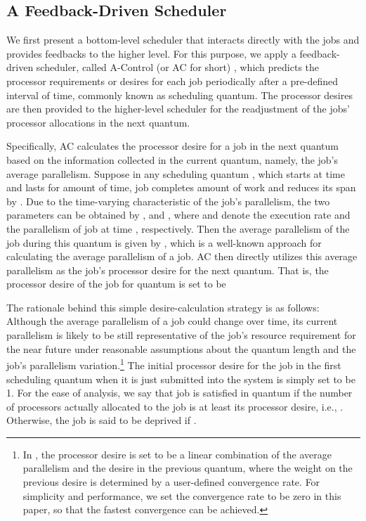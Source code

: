 \documentclass[10pt, a4paper]{article}
\begin{document}
\subsection{A Feedback-Driven Scheduler}

We first present a bottom-level scheduler that interacts directly with the jobs and provides
feedbacks to the higher level. For this purpose, we apply a feedback-driven scheduler, called
A-Control (or AC for short) \cite{SunCaHs11,SunHs08}, which predicts the processor requirements or
desires for each job periodically after a pre-defined interval of time, commonly known as
scheduling quantum. The processor desires are then provided to the higher-level scheduler for the
readjustment of the jobs' processor allocations in the next quantum.

Specifically, AC calculates the processor desire for a job in the next quantum based on the
information collected in the current quantum, namely, the job's average parallelism. Suppose in any
scheduling quantum , which starts at time  and lasts for  amount of time, job 
completes  amount of work and reduces its span by . Due to the time-varying
characteristic of the job's parallelism, the two parameters can be obtained by , and 
\cite{SunCaHs11}, where  and  denote the execution rate and the parallelism of
job  at time , respectively. Then the average parallelism of the job during this quantum is
given by , which is a well-known approach for calculating the average
parallelism of a job. AC then directly utilizes this average parallelism as the job's processor
desire for the next quantum. That is, the processor desire of the job for quantum  is set to
be


The rationale behind this simple desire-calculation strategy is as follows: Although the average
parallelism of a job could change over time, its current parallelism is likely to be still
representative of the job's resource requirement for the near future under reasonable assumptions
about the quantum length and the job's parallelism variation.\footnote{In \cite{SunCaHs11,SunHs08},
the processor desire is set to be a linear combination of the average parallelism and the desire in
the previous quantum, where the weight on the previous desire is determined by a user-defined
convergence rate. For simplicity and performance, we set the convergence rate to be zero in this
paper, so that the fastest convergence can be achieved.} The initial processor desire for the job
in the first scheduling quantum when it is just submitted into the system is simply set to be 1.
For the ease of analysis, we say that job  is satisfied in quantum  if the number of
processors  actually allocated to the job is at least its processor desire, i.e., . Otherwise, the job is said to be deprived if .
\end{document}

